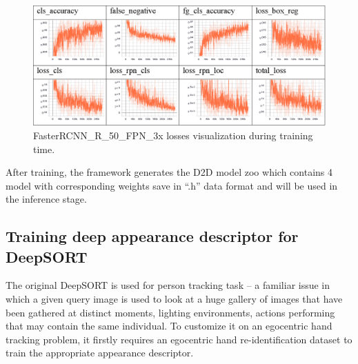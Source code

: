 \begin{figure}
	\centerline{\includegraphics[width=1\linewidth]{Figs/tensorboard.png}}
	\caption{FasterRCNN\_R\_50\_FPN\_3x losses visualization during training time.}
	\label{fig:tensorboard}
\end{figure}
After training, the framework generates the D2D model zoo which contains 4 model with corresponding weights save in “.h” data format and will be used in the inference stage.
\subsection{Training deep appearance descriptor for DeepSORT} \label{subsec:train_deep}
The original DeepSORT is used for person tracking task – a familiar issue in which a given query image is used to look at a huge gallery of images that have been gathered at distinct moments, lighting environments, actions performing that may contain the same individual. To customize it on an egocentric hand tracking problem, it firstly requires an egocentric hand re-identification dataset to train the appropriate appearance descriptor.

